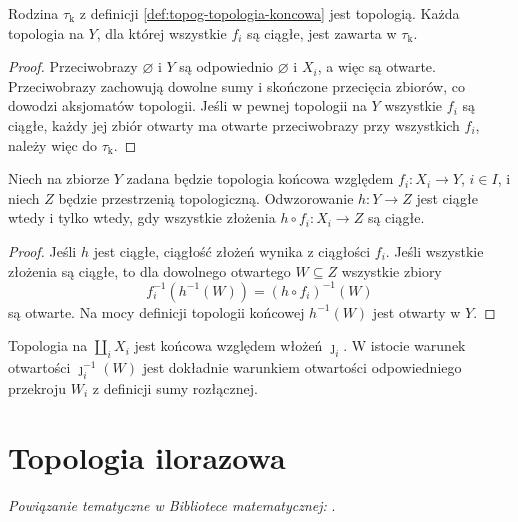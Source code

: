 \begin{stwierdzenie}
\label{prop:topog-koncowa-topologia}
Rodzina $\tau_{\mathrm k}$ z definicji
\ref{def:topog-topologia-koncowa} jest topologią.
Każda topologia na $Y$, dla której wszystkie $f_i$
są ciągłe, jest zawarta w $\tau_{\mathrm k}$.
\end{stwierdzenie}
\begin{proof}
Przeciwobrazy $\varnothing$ i $Y$ są odpowiednio
$\varnothing$ i $X_i$, a więc są otwarte.
Przeciwobrazy zachowują dowolne sumy i skończone
przecięcia zbiorów, co dowodzi aksjomatów topologii.
Jeśli w pewnej topologii na $Y$ wszystkie $f_i$
są ciągłe, każdy jej zbiór otwarty ma otwarte
przeciwobrazy przy wszystkich $f_i$, należy więc
do $\tau_{\mathrm k}$.
\end{proof}

\begin{twierdzenie}
\label{thm:topog-koncowa-uniwersalnosc}
Niech na zbiorze $Y$ zadana będzie topologia końcowa
względem $f_i\colon X_i\to Y$, $i\in I$, i niech
$Z$ będzie przestrzenią topologiczną. Odwzorowanie
$h\colon Y\to Z$ jest ciągłe wtedy i tylko wtedy, gdy
wszystkie złożenia $h\circ f_i\colon X_i\to Z$
są ciągłe.
\end{twierdzenie}
\begin{proof}
Jeśli $h$ jest ciągłe, ciągłość złożeń wynika z ciągłości
$f_i$. Jeśli wszystkie złożenia są ciągłe, to dla dowolnego
otwartego $W\subseteq Z$ wszystkie zbiory
\[
f_i^{-1}(h^{-1}(W))=(h\circ f_i)^{-1}(W)
\]
są otwarte. Na mocy definicji topologii końcowej
$h^{-1}(W)$ jest otwarty w $Y$.
\end{proof}

\begin{uwaga}
Topologia na $\coprod_i X_i$ jest końcowa względem
włożeń $\jmath_i$. W istocie warunek otwartości
$\jmath_i^{-1}(W)$ jest dokładnie warunkiem otwartości
odpowiedniego przekroju $W_i$ z definicji sumy rozłącznej.
\end{uwaga}

\section{Topologia ilorazowa}
\label{sec:topog-iloraz}

\noindent\emph{Powiązanie tematyczne w Bibliotece matematycznej:} .


